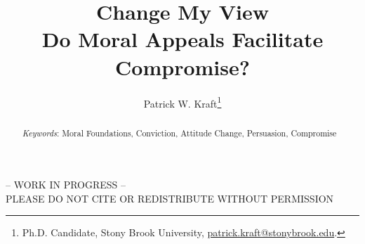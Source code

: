 \documentclass[12pt]{article}
\author{Patrick W. Kraft\footnote{Ph.D. Candidate, Stony Brook University, \href{mailto:patrick.kraft@stonybrook.edu}{patrick.kraft@stonybrook.edu}.
}}
\title{Change My View\\
\large{Do Moral Appeals Facilitate Compromise?}}
\date{}
\begin{document}
\maketitle
\doublespacing
\thispagestyle{empty}

\begin{center}
-- WORK IN PROGRESS -- \\
PLEASE DO NOT CITE OR REDISTRIBUTE WITHOUT PERMISSION
\end{center} 

\hfill
\begin{abstract}\singlespacing
\noindent 


\vspace{\baselineskip}
\noindent \textit{Keywords}: Moral Foundations, Conviction, Attitude Change, Persuasion, Compromise
\end{abstract}
\hfill

\newpage\setcounter{page}{1}


\clearpage
\singlespacing


\end{document}
